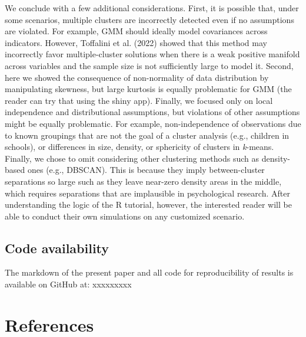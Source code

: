\documentclass[
  man,floatsintext]{apa6}
\begin{document}
We conclude with a few additional considerations. First, it is possible that, under some scenarios, multiple clusters are incorrectly detected even if no assumptions are violated. For example, GMM should ideally model covariances across indicators. However, Toffalini et al. (2022) showed that this method may incorrectly favor multiple-cluster solutions when there is a weak positive manifold across variables and the sample size is not sufficiently large to model it. Second, here we showed the consequence of non-normality of data distribution by manipulating skewness, but large kurtosis is equally problematic for GMM (the reader can try that using the shiny app). Finally, we focused only on local independence and distributional assumptions, but violations of other assumptions might be equally problematic. For example, non-independence of observations due to known groupings that are not the goal of a cluster analysis (e.g., children in schools), or differences in size, density, or sphericity of clusters in \emph{k}-means. Finally, we chose to omit considering other clustering methods such as density-based ones (e.g., DBSCAN). This is because they imply between-cluster separations so large such as they leave near-zero density areas in the middle, which requires separations that are implausible in psychological research. After understanding the logic of the R tutorial, however, the interested reader will be able to conduct their own simulations on any customized scenario.

\hypertarget{code-availability}{%
\subsection{Code availability}\label{code-availability}}

The markdown of the present paper and all code for reproducibility of results is available on GitHub at: xxxxxxxxx

\newpage

\hypertarget{references}{%
\section{References}\label{references}}
\end{document}

